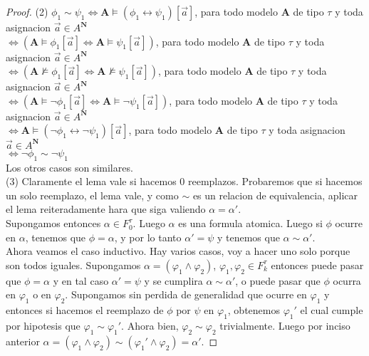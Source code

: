 \begin{proof}
  (2) $\phi_1\sim\psi_1 \iff \mathbf{A}\models(\phi_1\leftrightarrow\psi_1)[\vec{a}]$, para todo modelo $\mathbf{A}$ de tipo $\tau$ y toda asignacion $\vec{a} \in A^\mathbf{N}$\\
  $\iff (\mathbf{A}\models\phi_1[\vec{a}] \iff \mathbf{A}\models\psi_1[\vec{a}])$, para todo modelo $\mathbf{A}$ de tipo $\tau$ y toda asignacion $\vec{a} \in A^\mathbf{N}$\\
  $\iff (\mathbf{A}\not\models\phi_1[\vec{a}] \iff \mathbf{A}\not\models\psi_1[\vec{a}])$, para todo modelo $\mathbf{A}$ de tipo $\tau$ y toda asignacion $\vec{a} \in A^\mathbf{N}$\\
  $\iff (\mathbf{A}\models\neg\phi_1[\vec{a}] \iff \mathbf{A}\models\neg\psi_1[\vec{a}])$, para todo modelo $\mathbf{A}$ de tipo $\tau$ y toda asignacion $\vec{a} \in A^\mathbf{N}$\\
  $\iff \mathbf{A}\models(\neg\phi_1\leftrightarrow\neg\psi_1)[\vec{a}]$, para todo modelo $\mathbf{A}$ de tipo $\tau$ y toda asignacion $\vec{a} \in A^\mathbf{N}$\\
  $\iff \neg\phi_1\sim\neg\psi_1$\\
  Los otros casos son similares. \\
  (3) Claramente el lema vale si hacemos 0 reemplazos. Probaremos que si hacemos un solo reemplazo, el lema vale, y como $\sim$ es un relacion de equivalencia, 
  aplicar el lema reiteradamente hara que siga valiendo $\alpha = \alpha'$.\\
  Supongamos entonces $\alpha \in F_0^\tau$. Luego $\alpha$ es una formula atomica. Luego si $\phi$ ocurre en $\alpha$, tenemos que 
  $\phi = \alpha$, y por lo tanto $\alpha' = \psi$ y tenemos que $\alpha \sim \alpha'$.\\
  Ahora veamos el caso inductivo. Hay varios casos, voy a hacer uno solo porque son todos iguales. Supongamos $\alpha = (\varphi_1\land\varphi_2)$, $\varphi_1,\varphi_2\in F_k^\tau$
  entonces puede pasar que $\phi = \alpha$ y en tal caso $\alpha' = \psi$ y se cumplira $\alpha \sim \alpha'$, o puede pasar que 
  $\phi$ ocurra en $\varphi_1$ o en $\varphi_2$. Supongamos sin perdida de generalidad que ocurre en $\varphi_1$ y entonces si hacemos el reemplazo de $\phi$ por $\psi$ en $\varphi_1$,
  obtenemos $\varphi_1'$ el cual cumple por hipotesis que $\varphi_1 \sim \varphi_1'$. Ahora bien, $\varphi_2 \sim \varphi_2$ trivialmente.
  Luego por inciso anterior $\alpha = (\varphi_1\land\varphi_2) \sim (\varphi_1'\land\varphi_2) = \alpha'$.
\end{proof}

